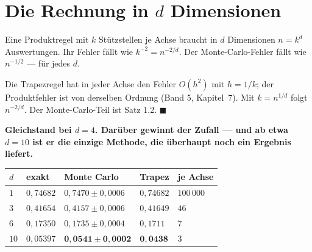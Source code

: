 \section{Die Rechnung in $d$ Dimensionen}

\begin{merksatz}
Eine Produktregel mit $k$ Stützstellen je Achse braucht in $d$ Dimensionen $n = k^{d}$ Auswertungen. Ihr Fehler fällt wie $k^{-2} = n^{-2/d}$. Der Monte-Carlo-Fehler fällt wie $n^{-1/2}$ --- für jedes $d$.

Die Trapezregel hat in jeder Achse den Fehler $O(h^{2})$ mit $h = 1/k$; der Produktfehler ist von derselben Ordnung (Band 5, Kapitel~7). Mit $k = n^{1/d}$ folgt $n^{-2/d}$. Der Monte-Carlo-Teil ist Satz 1.2. $\blacksquare$

\begin{center}
\begin{minipage}{0.9\textwidth}
\textbf{Gleichstand bei $d = 4$. Darüber gewinnt der Zufall --- und ab etwa $d = 10$ ist er die einzige Methode, die überhaupt noch ein Ergebnis liefert.}
\end{minipage}
\end{center}

\begin{center}
{\small
\renewcommand{\arraystretch}{1.48}
\begin{tabular}{@{}P{0.8cm}P{1.6cm}P{2.4cm}P{2.2cm}P{1.6cm}@{}}
\toprule
$d$ & \textbf{exakt} & \textbf{Monte Carlo} & \textbf{Trapez} & \textbf{je Achse}\\
\midrule
$1$ & $0{,}74682$ & $0{,}7470 \pm 0{,}0006$ & $0{,}74682$ & $100\,000$\\
$3$ & $0{,}41654$ & $0{,}4157 \pm 0{,}0006$ & $0{,}41649$ & $46$\\
$6$ & $0{,}17350$ & $0{,}1735 \pm 0{,}0004$ & $0{,}1711$ & $7$\\
$10$ & $0{,}05397$ & $\mathbf{0{,}0541 \pm 0{,}0002}$ & $\mathbf{0{,}0438}$ & $3$\\
\bottomrule
\end{tabular}}
\end{center}

\begin{center}
\begin{minipage}{0.88\textwidth}
\end{minipage}
\end{center}
\end{merksatz}

